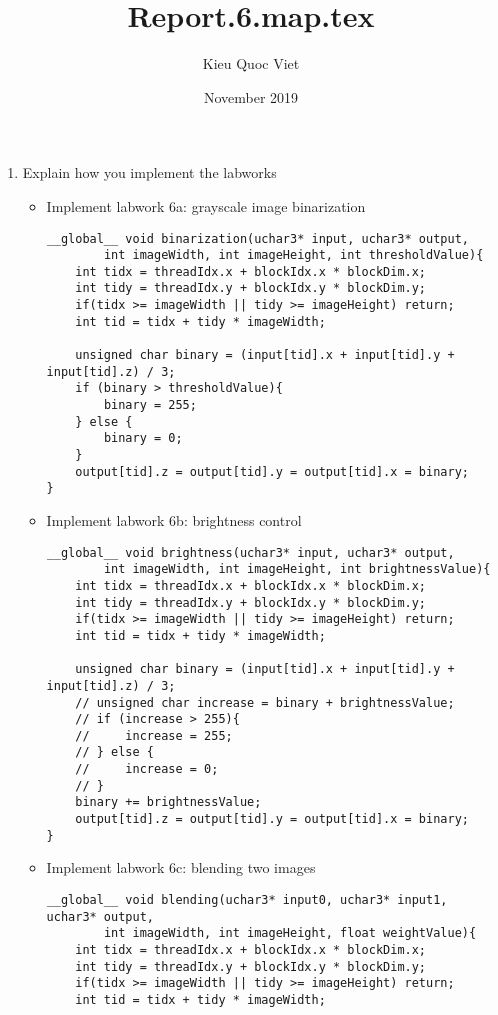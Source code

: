 \documentclass{article}
\title{Report.6.map.tex}
\author{Kieu Quoc Viet }
\date{November 2019}
\begin{document}
\maketitle

\begin{enumerate}
    \item Explain how you implement the labworks
    \begin{itemize}
    \item Implement labwork 6a: grayscale image binarization
    \begin{verbatim}
__global__ void binarization(uchar3* input, uchar3* output, 
        int imageWidth, int imageHeight, int thresholdValue){
    int tidx = threadIdx.x + blockIdx.x * blockDim.x;
    int tidy = threadIdx.y + blockIdx.y * blockDim.y;
    if(tidx >= imageWidth || tidy >= imageHeight) return;
    int tid = tidx + tidy * imageWidth;
    
    unsigned char binary = (input[tid].x + input[tid].y + input[tid].z) / 3;
    if (binary > thresholdValue){
        binary = 255;
    } else {
        binary = 0;
    }
    output[tid].z = output[tid].y = output[tid].x = binary;
}        
    \end{verbatim}
    
    \item Implement labwork 6b: brightness control
    \begin{verbatim}
__global__ void brightness(uchar3* input, uchar3* output, 
        int imageWidth, int imageHeight, int brightnessValue){
    int tidx = threadIdx.x + blockIdx.x * blockDim.x;
    int tidy = threadIdx.y + blockIdx.y * blockDim.y;
    if(tidx >= imageWidth || tidy >= imageHeight) return;
    int tid = tidx + tidy * imageWidth;
    
    unsigned char binary = (input[tid].x + input[tid].y + input[tid].z) / 3;
    // unsigned char increase = binary + brightnessValue;
    // if (increase > 255){
    //     increase = 255;
    // } else {
    //     increase = 0;
    // }
    binary += brightnessValue;
    output[tid].z = output[tid].y = output[tid].x = binary;
}        
    \end{verbatim}
    
    \item Implement labwork 6c: blending two images
    \begin{verbatim}
__global__ void blending(uchar3* input0, uchar3* input1, uchar3* output, 
        int imageWidth, int imageHeight, float weightValue){
    int tidx = threadIdx.x + blockIdx.x * blockDim.x;
    int tidy = threadIdx.y + blockIdx.y * blockDim.y;
    if(tidx >= imageWidth || tidy >= imageHeight) return;
    int tid = tidx + tidy * imageWidth;


\end{verbatim}
\end{itemize}
\end{enumerate}
\end{document}
